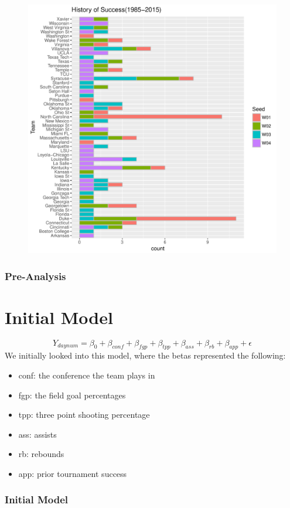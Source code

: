 \documentclass[11pt]{beamer}
\begin{document}
\begin{frame}
\begin{figure}[H]
	\centering
	\includegraphics[scale=.35]{HistOfSuccess.pdf}
\end{figure}
\frametitle{{\textbf{\huge Pre-Analysis}}}
\end{frame}
\section{Initial Model}
\begin{frame}
	\[
	Y_{daynum} = \beta_0 + \beta_{conf} + \beta_{fgp} +\beta_{tpp} + \beta_{ass} + \beta_{rb} + \beta_{app} + \epsilon
	\]
	\footnotesize We initially looked into this model, where the betas represented the following:
\begin{itemize}
	\item conf: the conference the team plays in
	\item fgp: the field goal percentages
	\item tpp: three point shooting percentage
	\item ass: assists
	\item rb: rebounds
	\item app: prior tournament success
\end{itemize}
\frametitle{{\textbf{\huge Initial Model}}}
\end{frame}
\end{document}

